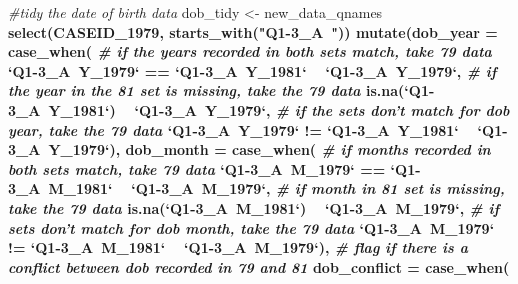 \documentclass{article}
\newenvironment{Shaded}{\begin{snugshade}}{\end{snugshade}}
\newcommand{\CommentTok}[1]{\textcolor[rgb]{0.56,0.35,0.01}{\textit{#1}}}
\newcommand{\DataTypeTok}[1]{\textcolor[rgb]{0.13,0.29,0.53}{#1}}
\newcommand{\DecValTok}[1]{\textcolor[rgb]{0.00,0.00,0.81}{#1}}
\newcommand{\KeywordTok}[1]{\textcolor[rgb]{0.13,0.29,0.53}{\textbf{#1}}}
\newcommand{\NormalTok}[1]{#1}
\newcommand{\OperatorTok}[1]{\textcolor[rgb]{0.81,0.36,0.00}{\textbf{#1}}}
\newcommand{\StringTok}[1]{\textcolor[rgb]{0.31,0.60,0.02}{#1}}
\begin{document}
\begin{Shaded}
\begin{Highlighting}[]
\CommentTok{#tidy the date of birth data}
\NormalTok{dob_tidy <-}\StringTok{ }\NormalTok{new_data_qnames }\OperatorTok{%
\StringTok{  }\KeywordTok{select}\NormalTok{(CASEID_}\DecValTok{1979}\NormalTok{,}
                \KeywordTok{starts_with}\NormalTok{(}\StringTok{"Q1-3_A~"}\NormalTok{)) }\OperatorTok{%
\StringTok{  }\KeywordTok{mutate}\NormalTok{(}\DataTypeTok{dob_year =} \KeywordTok{case_when}\NormalTok{(}
                      \CommentTok{# if the years recorded in both sets match, take 79 data}
                      \StringTok{`}\DataTypeTok{Q1-3_A~Y_1979}\StringTok{`} \OperatorTok{==}\StringTok{ `}\DataTypeTok{Q1-3_A~Y_1981}\StringTok{`} \OperatorTok{~}\StringTok{ `}\DataTypeTok{Q1-3_A~Y_1979}\StringTok{`}\NormalTok{,}
                      \CommentTok{# if the year in the 81 set is missing, take the 79 data}
                      \KeywordTok{is.na}\NormalTok{(}\StringTok{`}\DataTypeTok{Q1-3_A~Y_1981}\StringTok{`}\NormalTok{) }\OperatorTok{~}\StringTok{ `}\DataTypeTok{Q1-3_A~Y_1979}\StringTok{`}\NormalTok{,}
                      \CommentTok{# if the sets don't match for dob year, take the 79 data}
                      \StringTok{`}\DataTypeTok{Q1-3_A~Y_1979}\StringTok{`} \OperatorTok{!=}\StringTok{ `}\DataTypeTok{Q1-3_A~Y_1981}\StringTok{`} \OperatorTok{~}\StringTok{ `}\DataTypeTok{Q1-3_A~Y_1979}\StringTok{`}\NormalTok{),}
         \DataTypeTok{dob_month =} \KeywordTok{case_when}\NormalTok{(}
                      \CommentTok{# if months recorded in both sets match, take 79 data}
                      \StringTok{`}\DataTypeTok{Q1-3_A~M_1979}\StringTok{`} \OperatorTok{==}\StringTok{ `}\DataTypeTok{Q1-3_A~M_1981}\StringTok{`} \OperatorTok{~}\StringTok{ `}\DataTypeTok{Q1-3_A~M_1979}\StringTok{`}\NormalTok{,}
                      \CommentTok{# if month in 81 set is missing, take the 79 data}
                      \KeywordTok{is.na}\NormalTok{(}\StringTok{`}\DataTypeTok{Q1-3_A~M_1981}\StringTok{`}\NormalTok{) }\OperatorTok{~}\StringTok{ `}\DataTypeTok{Q1-3_A~M_1979}\StringTok{`}\NormalTok{,}
                      \CommentTok{# if sets don't match for dob month, take the 79 data}
                      \StringTok{`}\DataTypeTok{Q1-3_A~M_1979}\StringTok{`} \OperatorTok{!=}\StringTok{ `}\DataTypeTok{Q1-3_A~M_1981}\StringTok{`} \OperatorTok{~}\StringTok{ `}\DataTypeTok{Q1-3_A~M_1979}\StringTok{`}\NormalTok{),}
         \CommentTok{# flag if there is a conflict between dob recorded in 79 and 81}
         \DataTypeTok{dob_conflict =} \KeywordTok{case_when}\NormalTok{(}
}}
\end{Highlighting}
\end{Shaded}
\end{document}
